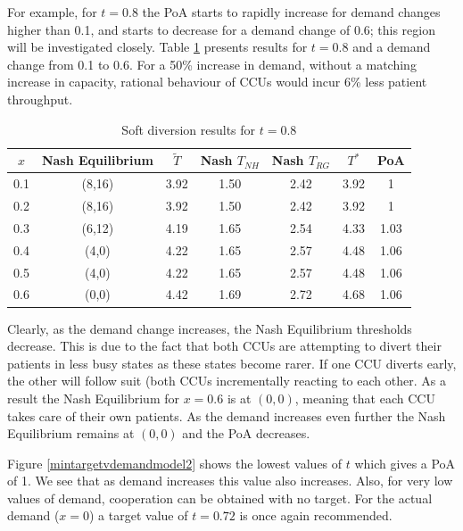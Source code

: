 \documentclass{article}
\begin{document}
For example, for $t=0.8$ the PoA starts to rapidly increase for demand changes higher than 0.1, and starts to decrease for a demand change of 0.6; this region will be investigated closely.
Table \ref{table_model2_target_demand} presents results for $t=0.8$ and a demand change from 0.1 to 0.6. For a 50\% increase in demand, without a matching increase in capacity, rational behaviour of CCUs would incur 6\% less patient throughput.

 \begin{table}[!htbp]
\begin{center}
\begin{tabular}{ccccccc}
\toprule
$x$&Nash Equilibrium&$\tilde T$&Nash $T_{NH}$& Nash $T_{RG}$& $T^*$& PoA\\
\midrule
0.1&(8,16)&3.92&1.50&2.42&3.92&1\\
0.2&(8,16)&3.92&1.50&2.42&3.92&1\\
0.3&(6,12)&4.19&1.65&2.54&4.33&1.03\\
0.4&(4,0)&4.22&1.65&2.57&4.48&1.06\\
0.5&(4,0)&4.22&1.65&2.57&4.48&1.06\\
0.6&(0,0)&4.42&1.69&2.72&4.68&1.06\\
\bottomrule
\end{tabular}
\end{center}
\caption{Soft diversion results for $t=0.8$}\label{table_model2_target_demand}
\end{table}


Clearly, as the demand change increases, the Nash Equilibrium thresholds decrease.
This is due to the fact that both CCUs are attempting to divert their patients in less busy states as these states become rarer.
If one CCU diverts early, the other will follow suit (both CCUs incrementally reacting to each other.
As a result the Nash Equilibrium for $x=0.6$ is at $(0,0)$, meaning that each CCU takes care of their own patients.
As the demand increases even further the Nash Equilibrium remains at $(0,0)$ and the PoA decreases.

Figure \ref{mintargetvdemandmodel2} shows the lowest values of $t$ which gives a PoA of 1.
We see that as demand increases this value also increases.
Also, for very low values of demand, cooperation can be obtained with no target.
For the actual demand ($x=0$) a target value of $t=0.72$ is once again recommended.
\end{document}
